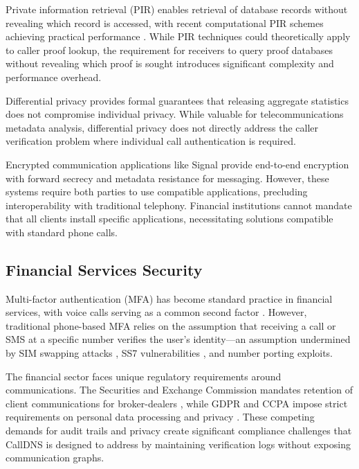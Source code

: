 \documentclass[11pt,twocolumn]{article}
\begin{document}
Private information retrieval (PIR) \cite{chor1995} enables retrieval of database records without revealing which record is accessed, with recent computational PIR schemes achieving practical performance \cite{angel2018}. While PIR techniques could theoretically apply to caller proof lookup, the requirement for receivers to query proof databases without revealing which proof is sought introduces significant complexity and performance overhead.

Differential privacy \cite{dwork2006} provides formal guarantees that releasing aggregate statistics does not compromise individual privacy. While valuable for telecommunications metadata analysis, differential privacy does not directly address the caller verification problem where individual call authentication is required.

Encrypted communication applications like Signal \cite{marlinspike2016} provide end-to-end encryption with forward secrecy and metadata resistance for messaging. However, these systems require both parties to use compatible applications, precluding interoperability with traditional telephony. Financial institutions cannot mandate that all clients install specific applications, necessitating solutions compatible with standard phone calls.

\subsection{Financial Services Security}

Multi-factor authentication (MFA) has become standard practice in financial services, with voice calls serving as a common second factor \cite{dasgupta2017}. However, traditional phone-based MFA relies on the assumption that receiving a call or SMS at a specific number verifies the user's identity—an assumption undermined by SIM swapping attacks \cite{lee2020}, SS7 vulnerabilities \cite{engel2017}, and number porting exploits.

The financial sector faces unique regulatory requirements around communications. The Securities and Exchange Commission mandates retention of client communications for broker-dealers \cite{sec2003}, while GDPR and CCPA impose strict requirements on personal data processing and privacy \cite{voigt2017}. These competing demands for audit trails and privacy create significant compliance challenges that CallDNS is designed to address by maintaining verification logs without exposing communication graphs.
\end{document}
